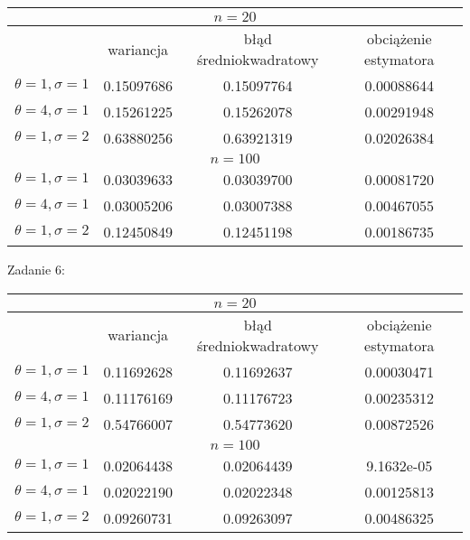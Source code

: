 \documentclass[a4paper]{article}
\begin{document}
\begin{table}[H]
\centering
\begin{tabular}{|c|c|c|c|}
\hline
\multicolumn{4}{|c|}{\textbf{$n=20$}}                                                       \\ \hline
         & wariancja           & błąd średniokwadratowy & obciążenie estymatora \\ \hline
$\theta=1,\sigma=1$ & 0.15097686 & 0.15097764 & 0.00088644 \\ \hline
$\theta=4,\sigma=1$ & 0.15261225 & 0.15262078 & 0.00291948 \\ \hline
$\theta=1,\sigma=2$ & 0.63880256 & 0.63921319 & 0.02026384 \\ \hline
\multicolumn{4}{|c|}{\textbf{$n=100$}}                                                       \\ \hline
$\theta=1,\sigma=1$ & 0.03039633 & 0.03039700 & 0.00081720 \\ \hline
$\theta=4,\sigma=1$ & 0.03005206 & 0.03007388 & 0.00467055 \\ \hline
$\theta=1,\sigma=2$ & 0.12450849 & 0.12451198 & 0.00186735 \\ \hline
\end{tabular}
\end{table}

Zadanie 6:


\begin{table}[H]
\centering
\begin{tabular}{|c|c|c|c|}
\hline
\multicolumn{4}{|c|}{\textbf{$n=20$}}                                                       \\ \hline
         & wariancja           & błąd średniokwadratowy & obciążenie estymatora \\ \hline
$\theta=1,\sigma=1$ & 0.11692628 & 0.11692637 & 0.00030471 \\ \hline
$\theta=4,\sigma=1$ & 0.11176169 & 0.11176723 & 0.00235312 \\ \hline
$\theta=1,\sigma=2$ & 0.54766007 & 0.54773620 & 0.00872526 \\ \hline
\multicolumn{4}{|c|}{\textbf{$n=100$}}                                                       \\ \hline
$\theta=1,\sigma=1$ & 0.02064438 & 0.02064439 & 9.1632e-05 \\ \hline
$\theta=4,\sigma=1$ & 0.02022190 & 0.02022348 & 0.00125813 \\ \hline
$\theta=1,\sigma=2$ & 0.09260731 & 0.09263097 & 0.00486325 \\ \hline
\end{tabular}
\end{table}
\end{document}
